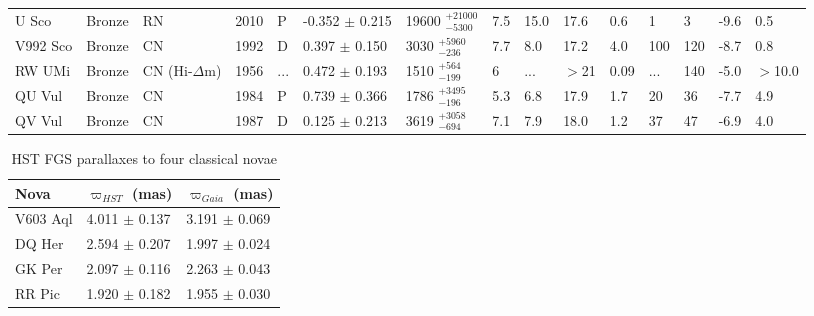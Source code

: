 \documentclass[a4paper,fleqn,usenatbib]{mnras}
\begin{document}
\begin{table*}
\begin{tabular}{lllllllllllllll}
U Sco	&	Bronze	&	RN	&	2010	&	P	&	-0.352	$\pm$	0.215	&	19600	$_{-	5300	}^{+	21000	}$ &	7.5	&	15.0	&	17.6	&	0.6	&	1	&	3	&	-9.6	&	0.5	\\
V992 Sco	&	Bronze	&	CN	&	1992	&	D	&	0.397	$\pm$	0.150	&	3030	$_{-	236	}^{+	5960	}$ &	7.7	&	8.0	&	17.2	&	4.0	&	100	&	120	&	-8.7	&	0.8	\\
RW UMi	&	Bronze	&	CN (Hi-$\Delta$m)	&	1956	&	...	&	0.472	$\pm$	0.193	&	1510	$_{-	199	}^{+	564	}$ &	6	&	...	&	$>$21	&	0.09	&	...	&	140	&	-5.0	&	$>$10.0	\\
QU Vul	&	Bronze	&	CN	&	1984	&	P	&	0.739	$\pm$	0.366	&	1786	$_{-	196	}^{+	3495	}$ &	5.3	&	6.8	&	17.9	&	1.7	&	20	&	36	&	-7.7	&	4.9	\\
QV Vul	&	Bronze	&	CN	&	1987	&	D	&	0.125	$\pm$	0.213	&	3619	$_{-	694	}^{+	3058	}$ &	7.1	&	7.9	&	18.0	&	1.2	&	37	&	47	&	-6.9	&	4.0	\\
		\hline
	\end{tabular}
\end{table*}


\newpage
\begin{table}
	\centering
	\caption{HST FGS parallaxes to four classical novae}
	\begin{tabular}{lll} 
		\hline
		Nova & $\varpi _{HST}$ (mas) & $\varpi _{Gaia}$ (mas)\\
		\hline
V603 Aql	&	4.011	$\pm$	0.137	&	3.191	$\pm$	0.069	\\
DQ Her	&	2.594	$\pm$	0.207	&	1.997	$\pm$	0.024	\\
GK Per	&	2.097	$\pm$	0.116	&	2.263	$\pm$	0.043	\\
RR Pic	&	1.920	$\pm$	0.182	&	1.955	$\pm$	0.030	\\
		\hline
	\end{tabular}
\end{table}

\newpage
\end{document}
